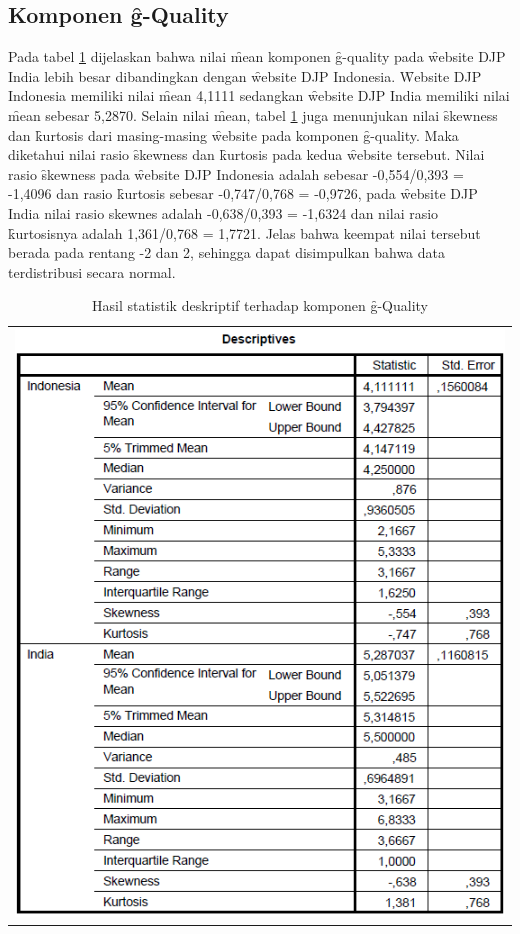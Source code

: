 \subsection{Komponen \f{g-Quality}}
Pada tabel \ref{tab:descgq} dijelaskan bahwa nilai \f{mean} komponen \f{g-quality} pada \f{website} DJP India lebih besar dibandingkan dengan \f{website} DJP Indonesia. \f{Website} DJP Indonesia memiliki nilai \f{mean} 4,1111 sedangkan \f{website} DJP India memiliki nilai \f{mean} sebesar 5,2870. Selain nilai \f{mean}, tabel \ref{tab:descgq} juga menunjukan nilai \f{skewness} dan \f{kurtosis} dari masing-masing \f{website} pada komponen \f{g-quality}. Maka diketahui nilai rasio \f{skewness} dan \f{kurtosis} pada kedua \f{website} tersebut. Nilai rasio \f{skewness} pada \f{website} DJP Indonesia adalah sebesar -0,554/0,393 = -1,4096 dan rasio \f{kurtosis} sebesar -0,747/0,768 = -0,9726, pada \f{website} DJP India nilai rasio skewnes adalah -0,638/0,393 = -1,6324 dan nilai rasio \f{kurtosis}nya adalah 1,361/0,768 = 1,7721. Jelas bahwa keempat nilai tersebut berada pada rentang -2 dan 2, sehingga dapat disimpulkan bahwa data terdistribusi secara normal. 
\begin{table}
	\centering
	\caption{Hasil statistik deskriptif terhadap komponen \f{g-Quality}}
	\label{tab:descgq}
	\begin{tabular}{c}
		\includegraphics[width=\textwidth]
		{pics/ordinaldescGQ.PNG}
	\end{tabular}
\end{table}
